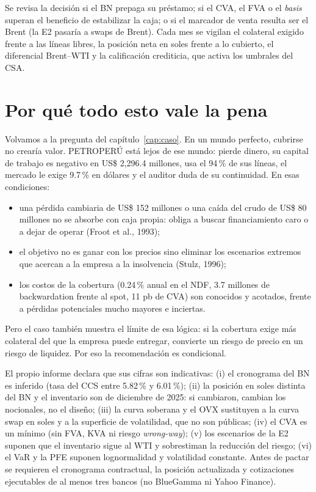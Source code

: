 \begin{informe}
Se revisa la decisión si el BN prepaga su préstamo; si el CVA, el FVA o el \emph{basis} superan el beneficio de estabilizar la caja; o si el marcador de venta resulta ser el Brent (la E2 pasaría a swaps de Brent). Cada mes se vigilan el colateral exigido frente a las líneas libres, la posición neta en soles frente a lo cubierto, el diferencial Brent--WTI y la calificación crediticia, que activa los umbrales del CSA.
\end{informe}

\section{Por qué todo esto vale la pena}

Volvamos a la pregunta del capítulo~\ref{cap:caso}. En un mundo perfecto, cubrirse no crearía valor. PETROPERÚ está lejos de ese mundo: pierde dinero, su capital de trabajo es negativo en US\$ 2,296.4 millones, usa el 94\,\% de sus líneas, el mercado le exige 9.7\,\% en dólares y el auditor duda de su continuidad. En esas condiciones:
\begin{itemize}
\item una pérdida cambiaria de US\$ 152 millones o una caída del crudo de US\$ 80 millones no se absorbe con caja propia: obliga a buscar financiamiento caro o a dejar de operar (Froot et al., 1993);
\item el objetivo no es ganar con los precios sino eliminar los escenarios extremos que acercan a la empresa a la insolvencia (Stulz, 1996);
\item los costos de la cobertura (0.24\,\% anual en el NDF, 3.7 millones de backwardation frente al spot, 11 pb de CVA) son conocidos y acotados, frente a pérdidas potenciales mucho mayores e inciertas.
\end{itemize}
Pero el caso también muestra el límite de esa lógica: si la cobertura exige más colateral del que la empresa puede entregar, convierte un riesgo de precio en un riesgo de liquidez. Por eso la recomendación es condicional.

\begin{adicional}
El propio informe declara que sus cifras son indicativas: (i) el cronograma del BN es inferido (tasa del CCS entre 5.82\,\% y 6.01\,\%); (ii) la posición en soles distinta del BN y el inventario son de diciembre de 2025: si cambiaron, cambian los nocionales, no el diseño; (iii) la curva soberana y el OVX sustituyen a la curva swap en soles y a la superficie de volatilidad, que no son públicas; (iv) el CVA es un mínimo (sin FVA, KVA ni riesgo \emph{wrong-way}); (v) los escenarios de la E2 suponen que el inventario sigue al WTI y sobrestiman la reducción del riesgo; (vi) el VaR y la PFE suponen lognormalidad y volatilidad constante. Antes de pactar se requieren el cronograma contractual, la posición actualizada y cotizaciones ejecutables de al menos tres bancos (no BlueGamma ni Yahoo Finance).
\end{adicional}

